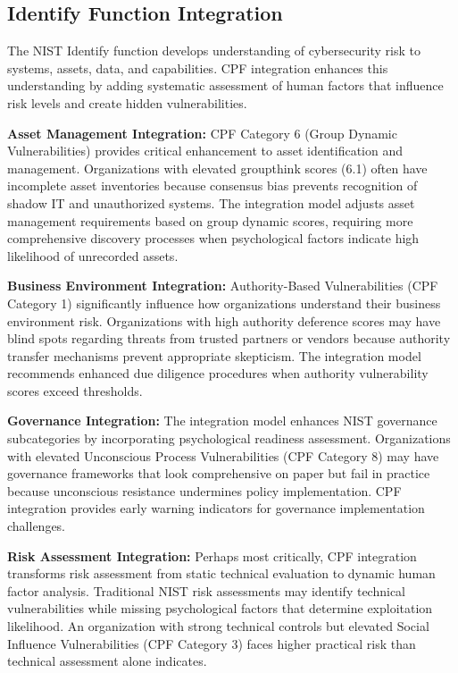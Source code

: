 \documentclass[10pt, twocolumn]{article}
\begin{document}
\subsection{Identify Function Integration}

The NIST Identify function develops understanding of cybersecurity risk to systems, assets, data, and capabilities. CPF integration enhances this understanding by adding systematic assessment of human factors that influence risk levels and create hidden vulnerabilities.

\textbf{Asset Management Integration:} CPF Category 6 (Group Dynamic Vulnerabilities) provides critical enhancement to asset identification and management. Organizations with elevated groupthink scores (6.1) often have incomplete asset inventories because consensus bias prevents recognition of shadow IT and unauthorized systems. The integration model adjusts asset management requirements based on group dynamic scores, requiring more comprehensive discovery processes when psychological factors indicate high likelihood of unrecorded assets.

\textbf{Business Environment Integration:} Authority-Based Vulnerabilities (CPF Category 1) significantly influence how organizations understand their business environment risk. Organizations with high authority deference scores may have blind spots regarding threats from trusted partners or vendors because authority transfer mechanisms prevent appropriate skepticism. The integration model recommends enhanced due diligence procedures when authority vulnerability scores exceed thresholds.

\textbf{Governance Integration:} The integration model enhances NIST governance subcategories by incorporating psychological readiness assessment. Organizations with elevated Unconscious Process Vulnerabilities (CPF Category 8) may have governance frameworks that look comprehensive on paper but fail in practice because unconscious resistance undermines policy implementation. CPF integration provides early warning indicators for governance implementation challenges.

\textbf{Risk Assessment Integration:} Perhaps most critically, CPF integration transforms risk assessment from static technical evaluation to dynamic human factor analysis. Traditional NIST risk assessments may identify technical vulnerabilities while missing psychological factors that determine exploitation likelihood. An organization with strong technical controls but elevated Social Influence Vulnerabilities (CPF Category 3) faces higher practical risk than technical assessment alone indicates.
\end{document}
